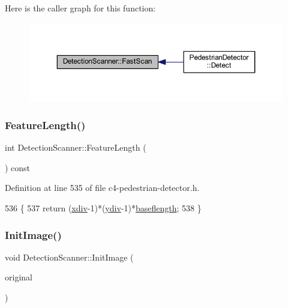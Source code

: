 Here is the caller graph for this function\+:\nopagebreak
\begin{figure}[H]
\begin{center}
\leavevmode
\includegraphics[width=350pt]{class_detection_scanner_aa27d494b253975922d853070aab7ce4d_icgraph}
\end{center}
\end{figure}
\mbox{\label{class_detection_scanner_a1e36d8da847810fc36860ea87a8eae6f}} 
\subsubsection{\texorpdfstring{Feature\+Length()}{FeatureLength()}}
{\footnotesize\ttfamily int Detection\+Scanner\+::\+Feature\+Length (\begin{DoxyParamCaption}{ }\end{DoxyParamCaption}) const\hspace{0.3cm}{\ttfamily [inline]}}



Definition at line 535 of file c4-\/pedestrian-\/detector.\+h.


\begin{DoxyCode}
536     \{
537         \textcolor{keywordflow}{return} (\mbox{\hyperlink{class_detection_scanner_ab7083b6ed15a71fa96d623a8f6500613}{xdiv}}-1)*(\mbox{\hyperlink{class_detection_scanner_a78f38bf8d0990ad9ea8cea03ffe4a189}{ydiv}}-1)*\mbox{\hyperlink{class_detection_scanner_aee5791fae7267a2f4a56e429d8842e6e}{baseflength}};
538     \}
\end{DoxyCode}
\mbox{\label{class_detection_scanner_af275e1362a1bc351f9a92323e0860d27}} 
\subsubsection{\texorpdfstring{Init\+Image()}{InitImage()}}
{\footnotesize\ttfamily void Detection\+Scanner\+::\+Init\+Image (\begin{DoxyParamCaption}\item[{\mbox{\hyperlink{class_int_image}{Int\+Image}}$<$ double $>$ \&}]{original }\end{DoxyParamCaption})\hspace{0.3cm}{\ttfamily [private]}}




